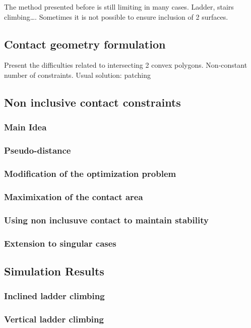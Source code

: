 The method presented before is still limiting in many cases. Ladder, stairs climbing\dots.
Sometimes it is not possible to ensure inclusion of 2 surfaces.

\subsection{Contact geometry formulation}
\label{sec:background}
Present the difficulties related to intersecting 2 convex polygons. Non-constant number of constraints.
Usual solution: patching

\subsection{Non inclusive contact constraints}
\subsubsection{Main Idea}
\subsubsection{Pseudo-distance}
\subsubsection{Modification of the optimization problem}
\subsubsection{Maximixation of the contact area}
\subsubsection{Using non inclusuve contact to maintain stability}
\subsubsection{Extension to singular cases}
\subsection{Simulation Results}
\subsubsection{Inclined ladder climbing}
\subsubsection{Vertical ladder climbing}
